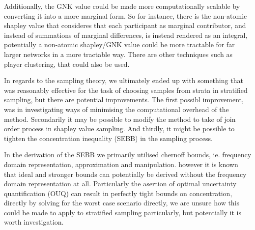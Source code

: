 

Additionally, the GNK value could be made more computationally scalable by converting it into a more marginal form.
So for instance, there is the non-atomic shapley value that consideres that each participant as marginal contributor, and instead of summations of marginal differences, is instead rendered as an integral, potentially a non-atomic shapley/GNK value could be more tractable for far larger networks in a more tractable way.
There are other techniques such as player clustering, that could also be used.

In regards to the sampling theory, we ultimately ended up with something that was reasonably effective for the task of choosing samples from strata in stratified sampling, but there are potential improvements.
The first possibl improvement, was in investigating ways of minimising the computational overhead of the method.
Secondarily it may be possible to modify the method to take of join order process in shapley value sampling.
And thirdly, it might be possible to tighten the concentration inequality (SEBB) in the sampling process.

In the derivation of the SEBB we primarily utilised chernoff bounds, ie. frequency domain representation, approximation and manipulation. however it is known that ideal and stronger bounds can potentially be derived without the frequency domain representation at all.
Particularly the asertion of optimal uncertainty quantification (OUQ) can result in perfectly tight bounds on concentration, directly by solving for the worst case scenario directly, we are unsure how this could be made to apply to stratified sampling particularly, but potentially it is worth investigation.\citep{OUQ1,doi:10.1137/13094712X}




